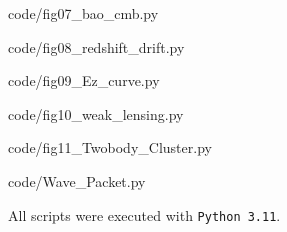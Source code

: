 
{code/fig07_bao_cmb.py}


{code/fig08_redshift_drift.py}


{code/fig09_Ez_curve.py}


{code/fig10_weak_lensing.py}


{code/fig11_Twobody_Cluster.py}


{code/Wave_Packet.py}

\bigskip
\noindent
All scripts were executed with \texttt{Python 3.11}.
